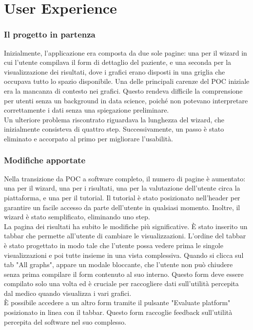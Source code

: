 \chapter{User Experience }
\label{cap:user-experience}

\subsection{Il progetto in partenza}
Inizialmente, l'applicazione era composta da due sole pagine: una per il wizard in cui l'utente compilava il form di dettaglio del paziente, e una seconda per la visualizzazione dei risultati, dove i grafici erano disposti in una griglia che occupava tutto lo spazio disponibile. Una delle principali carenze del POC iniziale era la mancanza di contesto nei grafici. Questo rendeva difficile la comprensione per utenti senza un background in data science, poiché non potevano interpretare correttamente i dati senza una spiegazione preliminare.\\

Un ulteriore problema riscontrato riguardava la lunghezza del wizard, che inizialmente consisteva di quattro step. Successivamente, un passo è stato eliminato e accorpato al primo per migliorare l'usabilità.

\subsection{Modifiche apportate}

Nella transizione da POC a software completo, il numero di pagine è aumentato: una per il wizard, una per i risultati, una per la valutazione dell'utente circa la piattaforma, e una per il tutorial. Il tutorial è stato posizionato nell'header per garantire un facile accesso da parte dell'utente in qualsiasi momento. Inoltre, il wizard è stato semplificato, eliminando uno step.\\

La pagina dei risultati ha subito le modifiche più significative. È stato inserito un tabbar che permette all'utente di cambiare le visualizzazioni. L'ordine del tabbar è stato progettato in modo tale che l'utente possa vedere prima le singole visualizzazioni e poi tutte insieme in una vista complessiva. Quando si clicca sul tab "All graphs", appare un modale bloccante, che l'utente non può chiudere senza prima compilare il form contenuto al suo interno. Questo form deve essere compilato solo una volta ed è cruciale per raccogliere dati sull'utilità percepita dal medico quando visualizza i vari grafici.\\
È possibile accedere a un altro form tramite il pulsante "Evaluate platform" posizionato in linea con il tabbar. Questo form raccoglie feedback sull'utilità percepita del software nel suo complesso.\\

